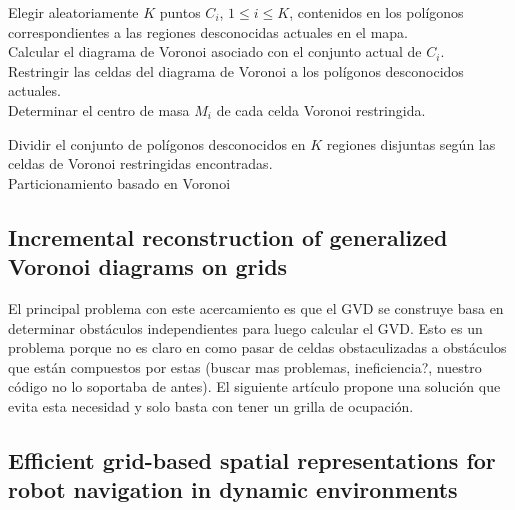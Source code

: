 \begin{algorithm}
\SetAlgoLined
    Elegir aleatoriamente $K$ puntos $C_i$, $1 \leq i \leq K$, contenidos en los polígonos correspondientes a las regiones desconocidas actuales en el mapa.\\
    Calcular el diagrama de Voronoi asociado con el conjunto actual de $C_i$.\\
    Restringir las celdas del diagrama de Voronoi a los polígonos desconocidos actuales.\\
    Determinar el centro de masa $M_i$ de cada celda Voronoi restringida.\\
    
    Dividir el conjunto de polígonos desconocidos en $K$ regiones disjuntas según las celdas de Voronoi restringidas encontradas.\\
    \caption{Particionamiento basado en Voronoi}
    \label{alg:particionamientovoronoi}
    
\end{algorithm}


\subsection{Incremental reconstruction of generalized Voronoi diagrams on grids}

El principal problema con este acercamiento es que el GVD se construye basa en determinar obstáculos independientes para luego calcular el GVD. Esto es un problema porque no es claro en como pasar de celdas obstaculizadas a obstáculos que están compuestos por estas (buscar mas problemas, ineficiencia?, nuestro código no lo soportaba de antes).  El siguiente artículo propone una solución que evita esta necesidad y solo basta con tener un grilla de ocupación.

\subsection{Efficient grid-based spatial representations for robot navigation in dynamic environments}

